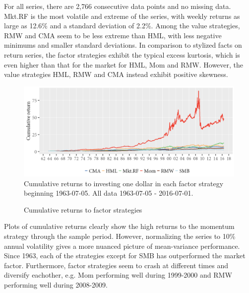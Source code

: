 For all series, there are 2,766 consecutive data points and no missing data. Mkt.RF is the most volatile and extreme of the series, with weekly returns as large as 12.6\% and a standard deviation of 2.2\%. Among the value strategies, RMW and CMA seem to be less extreme than HML, with less negative minimums and smaller standard deviations. In comparison to stylized facts on return series, the factor strategies exhibit the typical excess kurtosis, which is even higher than that for the market for HML, Mom and RMW. However, the value strategies HML, RMW and CMA instead exhibit positive skewness. 
\begin{figure}[H]
  \caption{Cumulative returns to factor strategies}
  \label{diag:cumret}
  \centering
  \begin{minipage}{\textwidth}
  \includegraphics[scale=1]{graphics/cumretPlot.png}  
  \vspace{3mm}
  \footnotesize
  Cumulative returns to investing one dollar in each factor strategy beginning 1963-07-05.  All data 1963-07-05 - 2016-07-01.
  \end{minipage}
\end{figure}
Plots of cumulative returns clearly show the high returns to the momentum strategy through the sample period. However, normalizing the series to 10\% annual volatility gives a more nuanced picture of mean-variance performance. Since 1963, each of the strategies except for SMB has outperformed the market factor. Furthermore, factor strategies seem to crash at different times and diversify eachother, e.g. Mom performing well during 1999-2000 and RMW performing well during 2008-2009.

